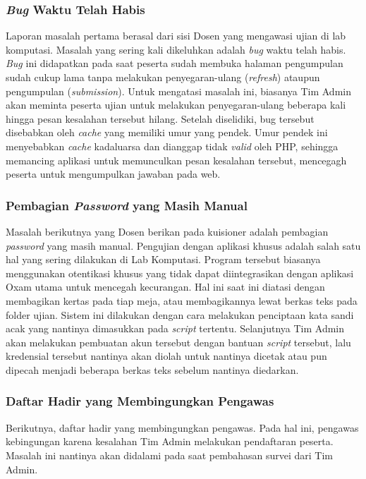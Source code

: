     \subsubsection{\textit{Bug} Waktu Telah
        Habis}\label{ref-prob-dosen-bug-waktu} Laporan masalah pertama berasal
        dari sisi Dosen yang mengawasi ujian di lab komputasi. Masalah yang
        sering kali dikeluhkan adalah \textit{bug} waktu telah habis.
        \textit{Bug} ini didapatkan pada saat peserta sudah membuka halaman
        pengumpulan sudah cukup lama tanpa melakukan penyegaran-ulang
        (\textit{refresh}) ataupun pengumpulan (\textit{submission}). Untuk
        mengatasi masalah ini, biasanya Tim Admin akan meminta peserta ujian
        untuk melakukan penyegaran-ulang beberapa kali hingga pesan kesalahan
        tersebut hilang. Setelah diselidiki, bug tersebut disebabkan oleh
        \textit{cache} yang memiliki umur yang pendek. Umur pendek ini
        menyebabkan \textit{cache} kadaluarsa dan dianggap tidak \textit{valid}
        oleh PHP, sehingga memancing aplikasi untuk memunculkan pesan kesalahan
        tersebut, mencegagh peserta untuk mengumpulkan jawaban pada web.
    
    \subsubsection{Pembagian \textit{Password} yang Masih
        Manual}\label{ref-prob-dosen-password} Masalah berikutnya yang Dosen
        berikan pada kuisioner adalah pembagian \textit{password} yang masih
        manual. Pengujian dengan aplikasi khusus adalah salah satu hal yang
        sering dilakukan di Lab Komputasi. Program tersebut biasanya menggunakan
        otentikasi khusus yang tidak dapat diintegrasikan dengan aplikasi Oxam
        utama untuk mencegah kecurangan. Hal ini saat ini diatasi dengan
        membagikan kertas pada tiap meja, atau membagikannya lewat berkas teks
        pada folder ujian. Sistem ini dilakukan dengan cara melakukan penciptaan
        kata sandi acak yang nantinya dimasukkan pada \textit{script} tertentu.
        Selanjutnya Tim Admin akan melakukan pembuatan akun tersebut dengan
        bantuan \textit{script} tersebut, lalu kredensial tersebut nantinya akan
        diolah untuk nantinya dicetak atau pun dipecah menjadi beberapa berkas
        teks sebelum nantinya diedarkan.

    \subsubsection{Daftar Hadir yang Membingungkan
        Pengawas}\label{ref-prob-dosen-daftar-hadir} Berikutnya, daftar hadir
        yang membingungkan pengawas. Pada hal ini, pengawas kebingungan karena
        kesalahan Tim Admin melakukan pendaftaran peserta. Masalah ini nantinya
        akan didalami pada saat pembahasan survei dari Tim Admin.

